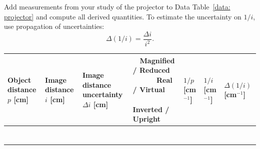 \documentclass[addpoints]{physlabs}
\begin{document}
\begin{postlab}



        \filbreak
        \question[1] Add measurements from your study of the projector to Data Table~\ref{data: projector} and compute all derived quantities. To estimate the uncertainty on $1/i$, use propagation of uncertainties:
        \[
            \Delta(1/i) = \frac{\Delta i}{i^2}.
        \]

        \begin{center}
            \renewcommand{\arraystretch}{1.5}
            \captionsetup{font=normalsize}
            \begin{tabular}{|>{\centering\arraybackslash}p{1.4cm}|>{\centering\arraybackslash}p{1.4cm}|>{\centering\arraybackslash}p{1.8cm}|>{\centering\arraybackslash}p{4.5cm}|>{\centering\arraybackslash}p{1.4cm}|>{\centering\arraybackslash}p{1.4cm}|>{\centering\arraybackslash}p{1.4cm}|}
                \hline
                \rowcolor{gray!20}
                Object distance $p$ [cm] & Image distance $i$ [cm] & Image distance uncertainty $\Delta i$ [cm] & $\quad$Magnified / Reduced$\quad$ $\qquad$Real / Virtual$\qquad$ $\qquad$Inverted / Upright$\qquad$ & $1/p$ [cm$^{-1}$] & $1/i$ [cm$^{-1}$] & $\Delta(1/i)$ [cm$^{-1}$] \\ \hline
                & & & & & & \\ \hline
                & & & & & & \\ \hline
                & & & & & & \\ \hline
                & & & & & & \\ \hline
                & & & & & & \\ \hline
                & & & & & & \\ \hline
                & & & & & & \\ \hline
            \end{tabular}
        \end{center}
        \begin{solution}[1cm]   
        \end{solution}


\end{postlab}
\end{document}
